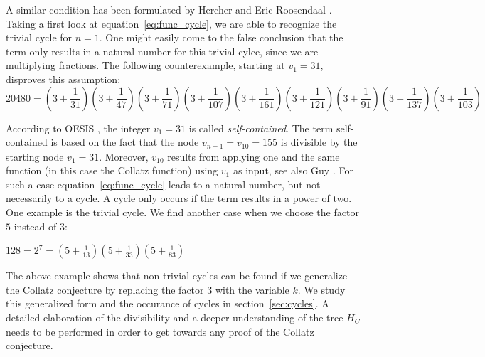 A similar condition has been formulated by Hercher \cite{Ref_Hercher} and Eric Roosendaal \cite{Ref_Roosendaal_2020}. Taking a first look at equation~\ref{eq:func_cycle}, we are able to recognize the trivial cycle for $n=1$. One might easily come to the false conclusion that the term only results in a natural number for this trivial cylce, since we are multiplying fractions. The following counterexample, starting at $v_1=31$, disproves this assumption:
\begin{equation*}
20480=\left(3+\frac{1}{31}\right)\left(3+\frac{1}{47}\right)
\left(3+\frac{1}{71}\right)\left(3+\frac{1}{107}\right)\left(3+\frac{1}{161}\right)\left(3+\frac{1}{121}\right)\left(3+\frac{1}{91}\right)\left(3+\frac{1}{137}\right)\left(3+\frac{1}{103}\right)
\end{equation*}

According to OESIS \cite{Ref_OESIS}, the integer $v_1=31$ is called \textit{self-contained}. The term self-contained is based on the fact that the node $v_{n+1}=v_{10}=155$ is divisible by the starting node $v_1=31$. Moreover, $v_{10}$ results from applying one and the same function (in this case the Collatz function) using $v_1$ as input, see also Guy \cite[p.~332]{Ref_Guy}. For such a case equation~\ref{eq:func_cycle} leads to a natural number, but not necessarily to a cycle. A cycle only occurs if the term results in a power of two. One example is the trivial cycle. We find another case when we choose the factor $5$ instead of $3$:
\begin{center}
	$128=2^7=\left(5+\frac{1}{13}\right)\left(5+\frac{1}{33}\right)
	\left(5+\frac{1}{83}\right)$
\end{center}

The above example shows that non-trivial cycles can be found if we generalize the Collatz conjecture by replacing the factor $3$ with the variable $k$. We study this generalized form and the occurance of cycles in section~\ref{sec:cycles}. A detailed elaboration of the divisibility and a deeper understanding of the tree $H_C$ needs to be performed in order to get towards any proof of the Collatz conjecture.


